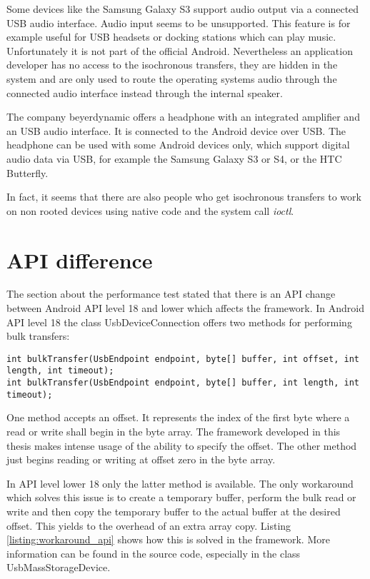 Some devices like the Samsung Galaxy S3 support audio output via a connected USB audio interface. Audio input seems to be unsupported. This feature is for example useful for USB headsets or docking stations which can play music. Unfortunately it is not part of the official Android. Nevertheless an application developer has no access to the isochronous transfers, they are hidden in the system and are only used to route the operating systems audio through the connected audio interface instead through the internal speaker.

The company beyerdynamic offers a headphone with an integrated amplifier and an USB audio interface. It is connected to the Android device over USB. The headphone can be used with some Android devices only, which support digital audio data via USB, for example the Samsung Galaxy S3 or S4, or the HTC Butterfly\cite{beyerdynamic}.

In fact, it seems that there are also people who get isochronous transfers to work on non rooted devices using native code and the system call \textit{ioctl}\cite{usb_audio_recorder, iso_stack}.

\chapter{API difference}
\label{chapter:api_diff}

The section about the performance test stated that there is an API change between Android API level 18 and lower which affects the framework. In Android API level 18 the class UsbDeviceConnection offers two methods for performing bulk transfers\cite{android_usb_dev_con}:

\lstset{language=Java}
\begin{lstlisting}[caption=Bulk transfers in UsbDeviceConnection, label=listing:wifi_connectg]
int bulkTransfer(UsbEndpoint endpoint, byte[] buffer, int offset, int length, int timeout);
int bulkTransfer(UsbEndpoint endpoint, byte[] buffer, int length, int timeout);
\end{lstlisting}

One method accepts an offset. It represents the index of the first byte where a read or write shall begin in the byte array. The framework developed in this thesis makes intense usage of the ability to specify the offset. The other method just begins reading or writing at offset zero in the byte array.

In API level lower 18 only the latter method is available. The only workaround which solves this issue is to create a temporary buffer, perform the bulk read or write and then copy the temporary buffer to the actual buffer at the desired offset. This yields to the overhead of an extra array copy. Listing \ref{listing:workaround_api} shows how this is solved in the framework. More information can be found in the source code, especially in the class \mbox{UsbMassStorageDevice}.

